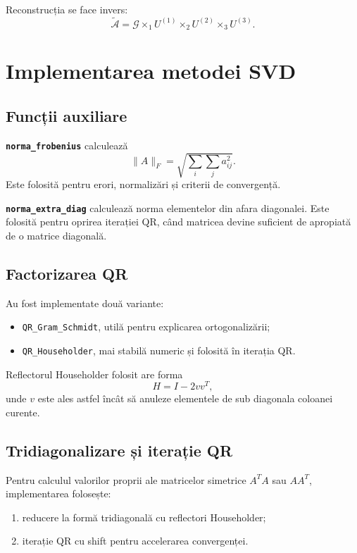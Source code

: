 \documentclass[12pt,a4paper]{article}
\theoremstyle{definition}
\begin{document}
Reconstrucția se face invers:
\[
  \tilde{\mathcal{A}} =
  \mathcal{G}
  \times_1 U^{(1)}
  \times_2 U^{(2)}
  \times_3 U^{(3)}.
\]

\section{Implementarea metodei SVD}

\subsection{Funcții auxiliare}

\textbf{\texttt{norma\_frobenius}} calculează
\[
  \|A\|_F=\sqrt{\sum_i\sum_j a_{ij}^2}.
\]
Este folosită pentru erori, normalizări și criterii de convergență.

\textbf{\texttt{norma\_extra\_diag}} calculează norma elementelor din afara diagonalei. Este folosită pentru oprirea iterației QR, când matricea devine suficient de apropiată de o matrice diagonală.

\subsection{Factorizarea QR}

Au fost implementate două variante:
\begin{itemize}
  \item \texttt{QR\_Gram\_Schmidt}, utilă pentru explicarea ortogonalizării;
  \item \texttt{QR\_Householder}, mai stabilă numeric și folosită în iterația QR.
\end{itemize}

Reflectorul Householder folosit are forma
\[
  H = I - 2vv^T,
\]
unde $v$ este ales astfel încât să anuleze elementele de sub diagonala coloanei curente.

\subsection{Tridiagonalizare și iterație QR}

Pentru calculul valorilor proprii ale matricelor simetrice $A^T A$ sau $A A^T$, implementarea folosește:
\begin{enumerate}
  \item reducere la formă tridiagonală cu reflectori Householder;
  \item iterație QR cu shift pentru accelerarea convergenței.
\end{enumerate}
\end{document}
